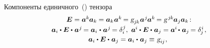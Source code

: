 \begin{otherlanguage}{russian}
Компоненты единичного~() тензора %
\vspace{0.1em}\begin{equation}\begin{array}{c}
\bm{E} = \bm{a}^{k} \hspace{-0.1ex} \bm{a}_{k} \hspace{-0.1ex} = \bm{a}_{k} \hspace{0.1ex} \bm{a}^{k} \hspace{-0.2ex} = \textsl{g}_{j\hspace{-0.1ex}k} \hspace{0.1ex} \bm{a}^{\hspace{0.1ex}j} \hspace{-0.1ex} \bm{a}^{k} \hspace{-0.2ex} = \textsl{g}^{\hspace{0.25ex}j\hspace{-0.1ex}k} \hspace{-0.1ex} \bm{a}_j \bm{a}_k \hspace{-0.32ex}: \\[0.2em]
%
\bm{a}_i \dotp \bm{E} \dotp \hspace{0.1ex} \bm{a}^{\hspace{0.1ex}j} \hspace{-0.2ex} = \bm{a}_i \hspace{0.1ex} \dotp \hspace{0.1ex} \bm{a}^{\hspace{0.1ex}j} \hspace{-0.2ex} = \delta_i^{\hspace{0.1ex}j} , \hspace{0.32em}
\bm{a}^{\hspace{-0.05ex}i} \dotp \bm{E} \dotp \hspace{0.1ex} \bm{a}_j = \bm{a}^{\hspace{-0.05ex}i} \hspace{-0.2ex} \dotp \hspace{0.1ex} \bm{a}_j \hspace{-0.2ex} = \delta_{\hspace{-0.1ex}j}^{\hspace{0.1ex}i} \hspace{0.2ex},
\\[0.2em]
%
\bm{a}_i \dotp \bm{E} \dotp \hspace{0.1ex} \bm{a}_j = \bm{a}_i \dotp \hspace{0.1ex} \bm{a}_j \equiv \hspace{0.16ex} \textsl{g}_{i\hspace{-0.1ex}j} \hspace{0.1ex} , \hspace{0.32em}

\end{array}
\end{equation}
\end{otherlanguage}
